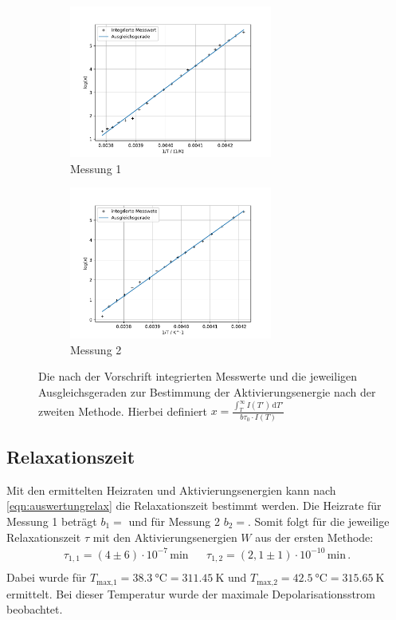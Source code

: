   \begin{figure}[H]
    \begin{subfigure}[b]{.5\linewidth}
      \centering
      \includegraphics[height=5cm, keepaspectratio]{build/log(int)_2durchT_1.pdf}
      \caption{Messung 1}
    \end{subfigure}
    \begin{subfigure}[b]{.5\linewidth}
      \centering
      \includegraphics[height=5cm, keepaspectratio]{build/log(int)_2durchT_2.pdf}
      \caption{Messung 2}
    \end{subfigure}
    \caption{Die nach der Vorschrift integrierten Messwerte und die jeweiligen Ausgleichsgeraden zur Bestimmung der Aktivierungsenergie nach der zweiten Methode.
      Hierbei definiert $x = \frac{\int_T^\infty I(T') \, \text{d}T'}{b \tau_0 \cdot I(T)}$}
    \label{fig:Trapez}
  \end{figure} %

\subsection{Relaxationszeit}
  Mit den ermittelten Heizraten und Aktivierungsenergien kann nach \eqref{eqn:auswertungrelax} die Relaxationszeit bestimmt werden.
  Die Heizrate für Messung 1 beträgt $b_1 = $ und für Messung 2 $b_2 = $.
  Somit folgt für die jeweilige Relaxationszeit $\tau$ mit den Aktivierungsenergien $W$ aus der ersten Methode:
  \begin{align*}
    \tau_{1,1} = (4\pm 6)\cdot 10^{-7}\,\si{\minute} &&  \tau_{1,2} = (2,1\pm 1)\cdot 10^{-10}\,\si{\minute} \, . \\
  \end{align*}
  Dabei wurde für $T_\text{max,1} = \SI{38.3}{\celsius} = \SI{311.45}{\kelvin} $ und $T_\text{max,2} = \SI{42.5}{\celsius} = \SI{315.65}{\kelvin}$ ermittelt.
  Bei dieser Temperatur wurde der maximale Depolarisationsstrom beobachtet.

